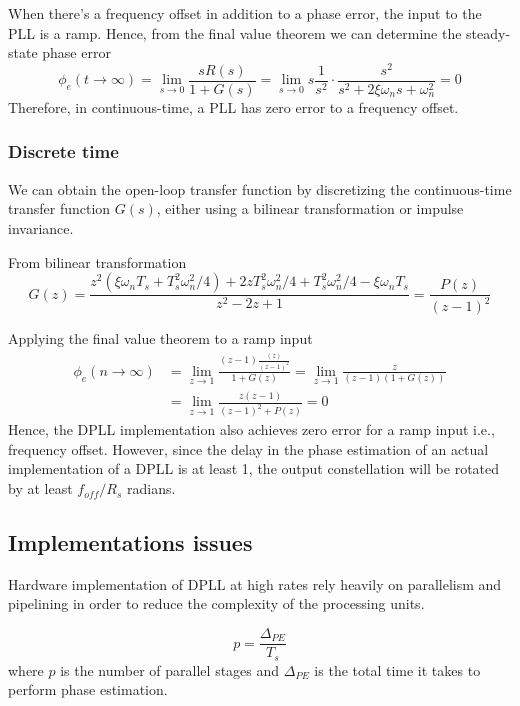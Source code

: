 \documentclass[a4paper]{article}
\begin{document}
When there's a frequency offset in addition to a phase error, the input to the PLL is a ramp. Hence, from the final value theorem we can determine the steady-state phase error
\begin{equation}
\phi_e(t\to\infty) = \lim_{s\to 0} \frac{sR(s)}{1 + G(s)} = \lim_{s\to 0}s\frac{1}{s^2}\cdot\frac{s^2}{s^2 + 2\xi\omega_ns + \omega_n^2} = 0
\end{equation}
Therefore, in continuous-time, a PLL has zero error to a frequency offset.

\subsubsection{Discrete time}

We can obtain the open-loop transfer function by discretizing the continuous-time transfer function $G(s)$, either using a bilinear transformation or impulse invariance.

From bilinear transformation
\begin{equation}
G(z) = \frac{z^2(\xi\omega_nT_s + T_s^2\omega_n^2/4) + 2zT_s^2\omega_n^2/4 + T_s^2\omega_n^2/4 - \xi\omega_nT_s}{z^2 - 2z + 1} = \frac{P(z)}{(z-1)^2}
\end{equation}

Applying the final value theorem to a ramp input
\begin{align} \nonumber
\phi_e(n\to\infty) &= \lim_{z\to 1} \frac{(z-1)\frac{(z)}{(z-1)^2}}{1 + G(z)} = \lim_{z\to 1} \frac{z}{(z-1)(1 + G(z))} \\
&= \lim_{z\to 1} \frac{z(z-1)}{(z-1)^2 + P(z)} = 0
\end{align}
Hence, the DPLL implementation also achieves zero error for a ramp input i.e., frequency offset. However, since the delay in the phase estimation of an actual implementation of a DPLL is at least 1, the output constellation will be rotated by at least $f_{off}/R_s$ radians.

\subsection{Implementations issues}
Hardware implementation of DPLL at high rates rely heavily on parallelism and pipelining in order to reduce the complexity of the processing units. 

\begin{equation}
p = \frac{\Delta_{PE}}{T_s}
\end{equation}
where $p$ is the number of parallel stages and $\Delta_{PE}$ is the total time it takes to perform phase estimation.
\end{document}
